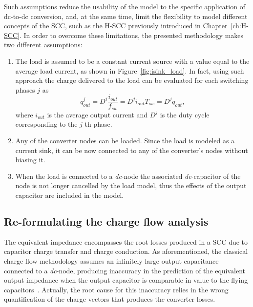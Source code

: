 Such assumptions reduce the usability of the model to the specific application of dc-to-dc conversion, and, at the same time, limit the flexibility to model different concepts of the SCC, such as the H-SCC previously introduced in Chapter~\ref{ch:H-SCC}. In order to overcome these limitations, the presented methodology makes two different assumptions:
\begin{enumerate}
  \item The load is assumed to be a constant current source with a value equal to the average load current, as shown in Figure~\ref{fig:isink_load}. In fact, using such approach the charge delivered to the load can be evaluated for each switching phases $j$ as
      \begin{equation}
        q_{out}^j = D^j \frac{i_{out}}{f_{sw}} = D^j i_{out}{T_{sw}}  = D^j q_{out},
      \label{eq:q_out}
      \end{equation}
  where $i_{out}$ is the average output current and $D^j$ is the duty cycle corresponding to the $j$-th phase.


  \item Any of the converter nodes can be loaded. Since the load is modeled as a current sink, it can be now connected to any of the converter's nodes without biasing it.

  \item When the load is connected to a \emph{dc}-node the associated \emph{dc}-capacitor of the node is not longer cancelled by the load model, thus the effects of the output capacitor are included in the model.

\end{enumerate}


\subsection{Re-formulating the charge flow analysis}

The equivalent impedance encompasses the root losses produced in a SCC due to capacitor charge transfer and charge conduction. As aforementioned, the classical charge flow methodology assumes an infinitely large output capacitance connected to a \emph{dc}-node, producing inaccuracy in the prediction of the equivalent output impedance when the output capacitor is comparable in value to the flying capacitors~\cite{2013Breussegem:c_out}. Actually, the root cause for this inaccuracy relies in the wrong quantification of the charge vectors that produces the converter losses.\\


